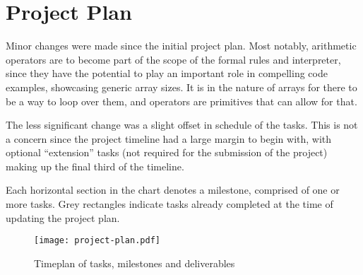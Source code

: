 \section{Project Plan}

Minor changes were made since the initial project plan. Most notably, arithmetic
operators are to become part of the scope of the formal rules and interpreter,
since they have the potential to play an important role in compelling code
examples, showcasing generic array sizes. It is in the nature of arrays for
there to be a way to loop over them, and operators are primitives that can allow
for that.

The less significant change was a slight offset in schedule of the tasks. This
is not a concern since the project timeline had a large margin to begin with,
with optional ``extension'' tasks (not required for the submission of the
project) making up the final third of the timeline.

Each horizontal section in the chart denotes a milestone, comprised of one or
more tasks. Grey rectangles indicate tasks already completed at the time of
updating the project plan.

\begin{figure}[h]
    \texttt{[image: project-plan.pdf]}
    \caption{Timeplan of tasks, milestones and deliverables}
\end{figure}
